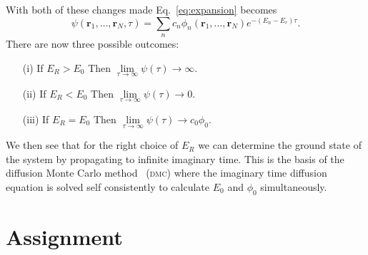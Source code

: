 \documentclass[letterpaper, 11 pt]{article}
\begin{document}
With both of these changes made Eq.~\eqref{eq:expansion} becomes
%
\begin{equation}
   \psi(\mathbf{r}_1,\dots,\mathbf{r}_N,\tau) = \sum_n c_n \phi_n(\mathbf{r}_1,\dots,\mathbf{r}_N)
   e^{-(E_n- E_r) \tau}.
\end{equation}
%
There are now three possible outcomes:

\begin{itemize}
      
   \item[(i)] If $E_R > E_0$ Then $\lim\limits_{\tau \rightarrow \infty} \psi(\tau) \rightarrow \infty$.

   \item[(ii)] If $E_R < E_0$ Then $\lim\limits_{\tau \rightarrow \infty} \psi(\tau) \rightarrow 0$.

   \item[(iii)] If $E_R = E_0$ Then $\lim\limits_{\tau \rightarrow \infty} \psi(\tau) \rightarrow
      c_0\phi_0$.

\end{itemize}
%
We then see that for the right choice of $E_R$ we can determine the ground state of the system by
propagating to infinite imaginary time. This is the basis of the diffusion Monte Carlo method~\cite{dmc} (\textsc{dmc}) where the imaginary time diffusion equation is solved self consistently to calculate
$E_0$ and $\phi_0$ simultaneously.

\section*{Assignment}
\end{document}
